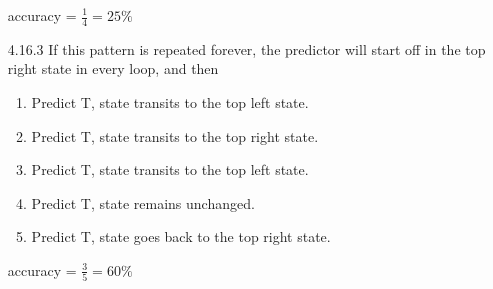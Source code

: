 \documentclass[12pt, a4paper]{article}
\begin{document}
\begin{itemize}[font=\bfseries]
\begin{enumerate}[(1)]
\end{enumerate}
accuracy = $\displaystyle \frac{1}{4} = 25\%$ 
\newpage
\item[4.16.3]
If this pattern is repeated forever, the predictor will start off in the top right state in every loop, and then
\begin{enumerate}[(1)]
\item Predict T, state transits to the top left state.
\item Predict T, state transits to the top right state.
\item Predict T, state transits to the top left state.
\item Predict T, state remains unchanged.
\item Predict T, state goes back to the top right state.
\end{enumerate}
accuracy = $\displaystyle \frac{3}{5} = 60\%$ 

\end{itemize}
\end{document}

